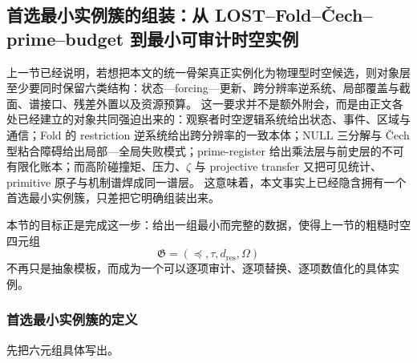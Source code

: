 \subsection{首选最小实例簇的组装：从 LOST–Fold–Čech–prime–budget 到最小可审计时空实例}\label{subsec:typed-address-biaxial-completion-preferred-minimal-instantiation}
上一节已经说明，若想把本文的统一骨架真正实例化为物理型时空候选，则对象层至少要同时保留六类结构：状态—forcing—更新、跨分辨率逆系统、局部覆盖与截面、谱接口、残差外置以及资源预算。
这一要求并不是额外附会，而是由正文各处已经建立的对象共同强迫出来的：观察者时空逻辑系统给出状态、事件、区域与通信；Fold 的 restriction 逆系统给出跨分辨率的一致本体；\(\mathrm{NULL}\) 三分解与 Čech 型粘合障碍给出局部—全局失败模式；prime-register 给出乘法层与前史层的不可有限化账本；而高阶碰撞矩、压力、\(\zeta\) 与 projective transfer 又把可见统计、primitive 原子与机制谱焊成同一谱层。
这意味着，本文事实上已经隐含拥有一个首选最小实例簇，只差把它明确组装出来。

本节的目标正是完成这一步：给出一组最小而完整的数据，使得上一节的粗糙时空四元组
\[
\mathfrak G=(\preceq,\tau,d_{\mathrm{res}},\Omega)
\]
不再只是抽象模板，而成为一个可以逐项审计、逐项替换、逐项数值化的具体实例。

\subsubsection{首选最小实例簇的定义}\label{subsubsec:typed-address-biaxial-completion-preferred-minimal-instantiation-definition}
先把六元组具体写出。

